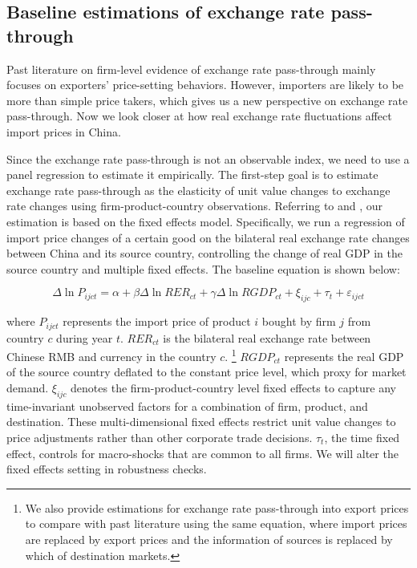 \documentclass[12pt]{article}
\begin{document}
\subsection{Baseline estimations of exchange rate pass-through} \label{Empirical-Baseline}

Past literature on firm-level evidence of exchange rate pass-through mainly focuses on exporters' price-setting behaviors. However, importers are likely to be more than simple price takers, which gives us a new perspective on exchange rate pass-through. Now we look closer at how real exchange rate fluctuations affect import prices in China.

Since the exchange rate pass-through is not an observable index, we need to use a panel regression to estimate it empirically. The first-step goal is to estimate exchange rate pass-through as the elasticity of unit value changes to exchange rate changes using firm-product-country observations. Referring to \cite{aik2014} and \cite{lmx2015}, our estimation is based on the fixed effects model. Specifically, we run a regression of import price changes of a certain good on the bilateral real exchange rate changes between China and its source country, controlling the change of real GDP in the source country and multiple fixed effects. The baseline equation is shown below:

\begin{equation}
	\Delta \ln P_{i j c t}=\alpha+\beta \Delta \ln R E R_{c t}+\gamma \Delta \ln R G D P_{c t}+\xi_{i j c}+\tau_{t}+\varepsilon_{i j c t}
	\label{eq.baseline}
\end{equation}

where $P_{ijct}$ represents the import price of product $i$ bought by firm $j$ from country $c$ during year $t$. $R E R_{c t}$ is the bilateral real exchange rate between Chinese RMB and currency in the country $c$. \footnote{We also provide estimations for exchange rate pass-through into export prices to compare with past literature using the same equation, where import prices are replaced by export prices and the information of sources is replaced by which of destination markets.} $RGDP_{ct}$ represents the real GDP of the source country deflated to the constant price level, which proxy for market demand. $\xi_{ijc}$ denotes the firm-product-country level fixed effects to capture any time-invariant unobserved factors for a combination of firm, product, and destination. These multi-dimensional fixed effects restrict unit value changes to price adjustments rather than other corporate trade decisions. $\tau_t$, the time fixed effect, controls for macro-shocks that are common to all firms. We will alter the fixed effects setting in robustness checks.
\end{document}
